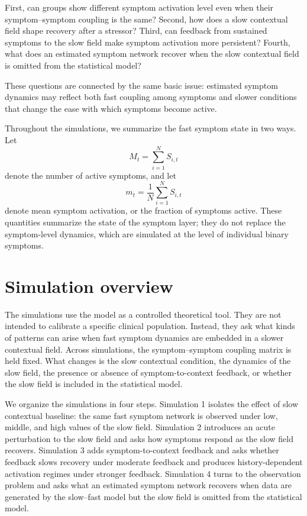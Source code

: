 \documentclass[man,12pt,floatsintext]{apa7}
\begin{document}
First, can groups show different symptom activation level even when their
symptom--symptom coupling is the same? Second, how does a slow contextual field
shape recovery after a stressor? Third, can feedback from sustained symptoms to
the slow field make symptom activation more persistent? Fourth, what does an
estimated symptom network recover when the slow contextual field is omitted
from the statistical model?

These questions are connected by the same basic issue: estimated symptom
dynamics may reflect both fast coupling among symptoms and slower conditions
that change the ease with which symptoms become active.

Throughout the simulations, we summarize the fast symptom state in two ways.
Let
\[
M_t=\sum_{i=1}^{N}S_{i,t}
\]
denote the number of active symptoms, and let
\[
m_t=\frac{1}{N}\sum_{i=1}^{N}S_{i,t}
\]
denote mean symptom activation, or the fraction of symptoms active. These
quantities summarize the state of the symptom layer; they do not replace the
symptom-level dynamics, which are simulated at the level of individual binary
symptoms.

\section{Simulation overview}
The simulations use the model as a controlled theoretical tool. They are not
intended to calibrate a specific clinical population. Instead, they ask what
kinds of patterns can arise when fast symptom dynamics are embedded in a slower
contextual field. Across simulations, the symptom--symptom coupling matrix is
held fixed. What changes is the slow contextual condition, the dynamics of the
slow field, the presence or absence of symptom-to-context feedback, or whether
the slow field is included in the statistical model.

We organize the simulations in four steps. Simulation 1 isolates the effect of
slow contextual baseline: the same fast symptom network is observed under low,
middle, and high values of the slow field. Simulation 2 introduces an acute
perturbation to the slow field and asks how symptoms respond as the slow field
recovers. Simulation 3 adds symptom-to-context feedback and asks whether
feedback slows recovery under moderate feedback and produces history-dependent
activation regimes under stronger feedback. Simulation 4 turns to the
observation problem and asks what an estimated symptom network recovers when
data are generated by the slow--fast model but the slow field is omitted from
the statistical model.
\end{document}
